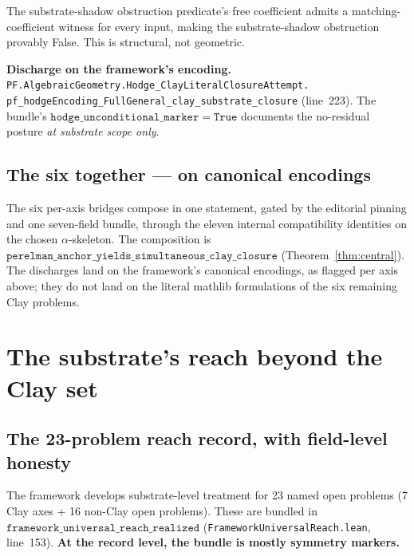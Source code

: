 \documentclass[11pt,a4paper]{article}
\theoremstyle{plain}
\theoremstyle{definition}
\begin{document}
\noindent
The substrate-shadow obstruction predicate's free coefficient
admits a matching-coefficient witness for every input, making the
substrate-shadow obstruction provably False. This is structural,
not geometric.

\textbf{Discharge on the framework's encoding.}
\texttt{PF.AlgebraicGeometry.Hodge\_ClayLiteralClosureAttempt.\\
pf\_hodgeEncoding\_FullGeneral\_clay\_substrate\_closure}
(line~223). The bundle's
$\mathtt{hodge\_unconditional\_marker} = \mathtt{True}$ documents
the no-residual posture \emph{at substrate scope only}.

\subsection{The six together --- on canonical encodings}
\label{sec:six-together}

The six per-axis bridges compose in one statement, gated by the
editorial pinning and one seven-field bundle, through the eleven
internal compatibility identities on the chosen
$\alpha$-skeleton. The composition is
$\mathtt{perelman\_anchor\_yields\_simultaneous\_clay\_closure}$
(Theorem~\ref{thm:central}). The discharges land on the
framework's canonical encodings, as flagged per axis above; they
do not land on the literal mathlib formulations of the six
remaining Clay problems.

\section{The substrate's reach beyond the Clay set}
\label{sec:reach}

\subsection{The 23-problem reach record, with field-level honesty}
\label{sec:reach-record}

The framework develops substrate-level treatment for 23 named
open problems (7 Clay axes + 16 non-Clay open problems). These
are bundled in $\mathtt{framework\_universal\_reach\_realized}$
(\texttt{FrameworkUniversalReach.lean}, line~153). \textbf{At
the record level, the bundle is mostly symmetry markers.}

\medskip
\end{document}
